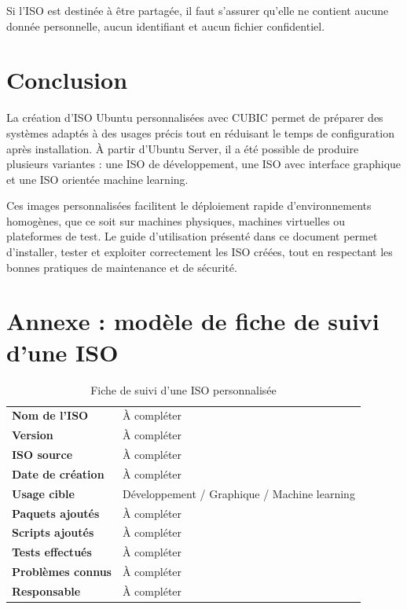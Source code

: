 \documentclass[12pt,a4paper]{article}
\begin{document}
Si l'ISO est destinée à être partagée, il faut s'assurer qu'elle ne contient aucune donnée personnelle, aucun identifiant et aucun fichier confidentiel.

\section{Conclusion}

La création d'ISO Ubuntu personnalisées avec CUBIC permet de préparer des systèmes adaptés à des usages précis tout en réduisant le temps de configuration après installation. À partir d'Ubuntu Server, il a été possible de produire plusieurs variantes : une ISO de développement, une ISO avec interface graphique et une ISO orientée machine learning.

Ces images personnalisées facilitent le déploiement rapide d'environnements homogènes, que ce soit sur machines physiques, machines virtuelles ou plateformes de test. Le guide d'utilisation présenté dans ce document permet d'installer, tester et exploiter correctement les ISO créées, tout en respectant les bonnes pratiques de maintenance et de sécurité.

\appendix
\section{Annexe : modèle de fiche de suivi d'une ISO}

\begin{table}[H]
\centering
\begin{tabular}{>{\bfseries}p{5cm}p{9cm}}
\toprule
Nom de l'ISO & À compléter \\
Version & À compléter \\
ISO source & À compléter \\
Date de création & À compléter \\
Usage cible & Développement / Graphique / Machine learning \\
Paquets ajoutés & À compléter \\
Scripts ajoutés & À compléter \\
Tests effectués & À compléter \\
Problèmes connus & À compléter \\
Responsable & À compléter \\
\bottomrule
\end{tabular}
\caption{Fiche de suivi d'une ISO personnalisée}
\end{table}
\end{document}

